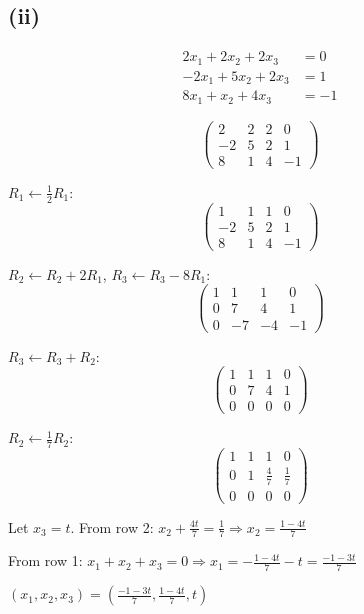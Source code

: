 \subsection*{(ii)}
\begin{align*}
	2x_1 + 2x_2 + 2x_3  & = 0  \\
	-2x_1 + 5x_2 + 2x_3 & = 1  \\
	8x_1 + x_2 + 4x_3   & = -1
\end{align*}

\[
	\left(\begin{array}{ccc|c}
			2  & 2 & 2 & 0  \\
			-2 & 5 & 2 & 1  \\
			8  & 1 & 4 & -1
		\end{array}\right)
\]

$R_1 \leftarrow \frac{1}{2}R_1$:
\[
	\left(\begin{array}{ccc|c}
			1  & 1 & 1 & 0  \\
			-2 & 5 & 2 & 1  \\
			8  & 1 & 4 & -1
		\end{array}\right)
\]

$R_2 \leftarrow R_2 + 2R_1$, $R_3 \leftarrow R_3 - 8R_1$:
\[
	\left(\begin{array}{ccc|c}
			1 & 1  & 1  & 0  \\
			0 & 7  & 4  & 1  \\
			0 & -7 & -4 & -1
		\end{array}\right)
\]

$R_3 \leftarrow R_3 + R_2$:
\[
	\left(\begin{array}{ccc|c}
			1 & 1 & 1 & 0 \\
			0 & 7 & 4 & 1 \\
			0 & 0 & 0 & 0
		\end{array}\right)
\]

$R_2 \leftarrow \frac{1}{7}R_2$:
\[
	\left(\begin{array}{ccc|c}
			1 & 1 & 1           & 0           \\
			0 & 1 & \frac{4}{7} & \frac{1}{7} \\
			0 & 0 & 0           & 0
		\end{array}\right)
\]

Let $x_3 = t$. From row 2: $x_2 + \frac{4t}{7} = \frac{1}{7} \Rightarrow x_2 = \frac{1-4t}{7}$

From row 1: $x_1 + x_2 + x_3 = 0 \Rightarrow x_1 = -\frac{1-4t}{7} - t = \frac{-1-3t}{7}$

$\boxed{(x_1, x_2, x_3) = \left(\frac{-1-3t}{7}, \frac{1-4t}{7}, t\right)}$